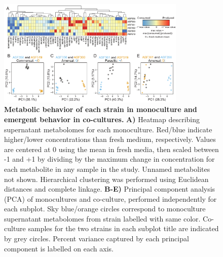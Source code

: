\documentclass[11pt,twocolumn,notitlepage,openany,twoside]{book}
\begin{document}
\begin{figure}
\centering
\includegraphics[width=0.8\textwidth]{ch2_fig3}
\caption[Metabolic behavior of each strain in monoculture and emergent behavior in co-cultures.]{\textbf{Metabolic behavior of each strain in monoculture and emergent behavior in co-cultures.} \textbf{A)} Heatmap describing supernatant metabolomes for each monoculture. Red/blue indicate higher/lower concentrations than fresh medium, respectively. Values are centered at 0 using the mean in fresh media, then scaled between -1 and +1 by dividing by the maximum change in concentration for each metabolite in any sample in the study. Unnamed metabolites not shown. Hierarchical clustering was performed using Euclidean distances and complete linkage. \textbf{B-E)} Principal component analysis (PCA) of monocultures and co-culture, performed independently for each subplot. Sky blue/orange circles correspond to monoculture supernatant metabolomes from strain labelled with same color. Co-culture samples for the two strains in each subplot title are indicated by grey circles. Percent variance captured by each principal component is labelled on each axis.}
\end{figure}
\end{document}
